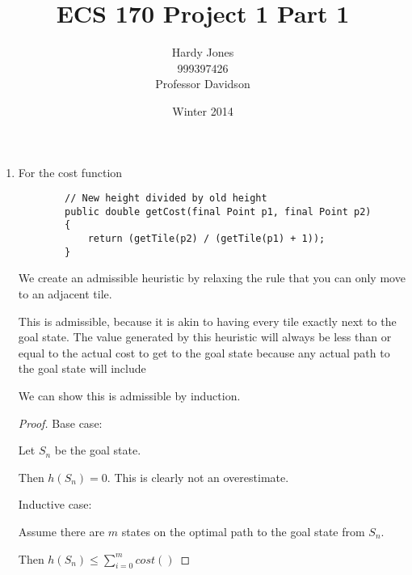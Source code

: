 \documentclass[12pt,letterpaper]{article}
\title{ECS 170 Project 1 Part 1\vspace{-2ex}}
\author{Hardy Jones\\
        999397426\\
        Professor Davidson\vspace{-2ex}}
\date{Winter 2014}
\begin{document}
  \maketitle




  \begin{enumerate}
    \item
      For the cost function
      \begin{lstlisting}
        // New height divided by old height
        public double getCost(final Point p1, final Point p2)
        {
            return (getTile(p2) / (getTile(p1) + 1));
        }
      \end{lstlisting}

      We create an admissible heuristic by relaxing the rule that you can only move to an adjacent tile.

      This is admissible, because it is akin to having every tile exactly next to the goal state. The value generated by this heuristic will always be less than or equal to the actual cost to get to the goal state because any actual path to the goal state will include

      We can show this is admissible by induction.

      \begin{proof}
        Base case:

        Let $S_n$ be the goal state.

        Then $h(S_n) = 0$. This is clearly not an overestimate.

        Inductive case:

        Assume there are $m$ states on the optimal path to the goal state from $S_n$.

        Then $h(S_n) \le \sum_{i=0}^m cost()$
      \end{proof}

  \end{enumerate}
\end{document}
